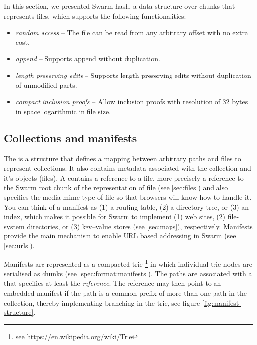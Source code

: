 In this section, we presented Swarm hash, a data structure over chunks that represents files, which supports the following functionalities:

\begin{itemize}
    \item \emph{random access} -- The file can be read from any arbitrary offset with no extra cost.
    \item \emph{append} -- Supports append without duplication. 
    \item \emph{length preserving edits} -- Supports length preserving edits without duplication of unmodified parts.
    \item \emph{compact inclusion proofs} -- Allow inclusion proofs with resolution of 32 bytes in space logarithmic in file size.
\end{itemize}



\subsection{Collections and manifests\statusgreen}\label{sec:collections}

The  is a structure that defines a mapping between arbitrary paths and files to represent collections. It also contains metadata associated with the collection and it's objects (files). A  contains a reference to a file, more precisely a reference to the Swarm root chunk of the representation of file (see \ref{sec:files}) and also specifies the media mime type of file so that browsers will know how to handle it. You can think of a manifest as (1) a routing table, (2) a directory tree, or  (3) an index, which makes it possible for Swarm to implement (1) web sites, (2) file-system directories, or (3) key--value stores (see \ref{sec:maps}), respectively. Manifests provide the main mechanism to enable URL based addressing in Swarm (see \ref{sec:urls}). 

Manifests are represented as a compacted trie%
%
\footnote{see \url{https://en.wikipedia.org/wiki/Trie}}
%
in which individual trie nodes are serialised as chunks (see \ref{spec:format:manifests}). The paths are associated with a  that specifies at least the \emph{reference}. The reference may then point to an embedded manifest if the path is a common prefix of more than one path in the collection, thereby implementing branching in the trie, see figure \ref{fig:manifest-structure}. 


